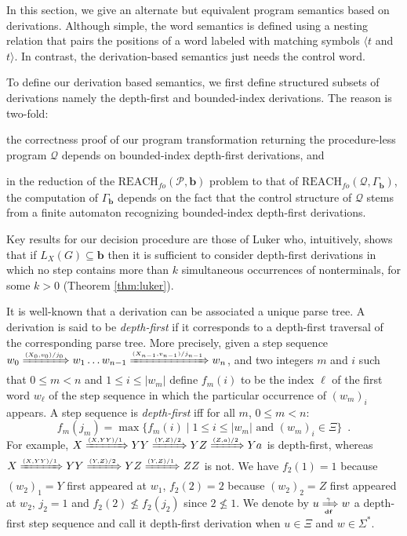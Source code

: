 \documentclass[final]{llncs}
\newcommand{\Arrow}[1]{\xRightarrow{{\scriptscriptstyle #1}}}
\newcommand{\xArrow}[2]{\xRightarrow[{\scriptscriptstyle #2}]{{\scriptscriptstyle #1}}}
\def\len#1{{\vert{#1}\vert}}
\def\pat{{\mathbf{b}}}
\def\patg{{\Gamma_\pat}}
\def\Vars{\ensuremath{\Xi}}
\def\foreach{\mathrm{REACH}_{\mathit{fo}}}
\begin{document}
In this section, we give an alternate but equivalent program semantics
based on derivations.  Although simple, the word semantics is defined
using a nesting relation that pairs the positions of a word labeled
with matching symbols \(\langle\!t\) and \(t\!\rangle\). In contrast,
the derivation-based semantics just needs the control word.

To define our derivation based semantics, we first define structured
subsets of derivations namely the depth-first and bounded-index
derivations. The reason is two-fold:
\begin{inparaenum}
\item the correctness proof of our program transformation \cite{gik13} 
      returning the procedure-less program \(\mathcal{Q}\) depends on
	bounded-index depth-first derivations, and
\item in the reduction of the \(\foreach(\mathcal{P},\pat)\) problem to
	that of \(\foreach(\mathcal{Q},\patg)\), the computation
	of \(\patg\) depends on the fact that the control structure
	of \(\mathcal{Q}\) stems from a finite automaton recognizing
	bounded-index depth-first derivations.
\end{inparaenum}
Key results for our decision procedure are those of
Luker \cite{Luker78,Luker80} who, intuitively, shows that
if \(L_X(G) \subseteq \pat\) then it is sufficient to consider
depth-first derivations in which no step contains more than \(k\)
simultaneous occurrences of nonterminals, for some \(k>0\)
(Theorem \ref{thm:luker}). 

It is well-known that a derivation can be associated a unique parse
tree.  A derivation is said to be \emph{depth-first} if it corresponds
to a depth-first traversal of the corresponding parse tree.  More
precisely, given a step sequence \(w_0 \Arrow{(X_0,v_0)/j_0}
w_1 \ldots w_{n{-}1} \Arrow{(X_{n{-}1},v_{n{-}1})/j_{n{-}1}} w_{n}\), and two
integers \(m\) and
\(i\) such that \(0 \leq m < n\) and \(1\leq i\leq \len{w_m}\) define
\(f_m(i)\) to be the index \(\ell\) of the first word \(w_{\ell}\) of the step
sequence in which the particular occurrence of \( (w_m)_i \) appears.
A step sequence is \emph{depth-first} \cite{Luker80} if{}f for all \(m\), \(0\leq m < n\):
{\setlength\abovedisplayskip{4pt}
\setlength\belowdisplayskip{4pt}
\[ f_m( j_m ) = \max \{ f_m( i )  \mid  1\leq i \leq \len{w_m}\text{ and } (w_m)_i \in \Vars\}\enspace .\]}
For example, \(X \Arrow{(X,YY)/1} YY \Arrow{(Y,Z)/2}
YZ \Arrow{(Z,a)/2} Ya\) is depth-first, whereas \(X \Arrow{(X,YY)/1}
YY \Arrow{(Y,Z)/2} YZ \Arrow{(Y,Z)/1} ZZ\) is not. We
have \(f_2(1)=1\) because \( (w_2)_1 = Y\) first appeared
at \(w_1\), \(f_2(2)=2\) because \( (w_2)_2 = Z \) first appeared
at \(w_2\), \(j_2=1\) and \( f_2(2) \nleq f_2(j_2) \) since \(2 \nleq
1\). We denote by $u \xArrow{\gamma}{\mathbf{df}} w$ a depth-first
step sequence and call it depth-first derivation when \(u\in\Vars\) and \(w\in\Sigma^*\).
\end{document}
